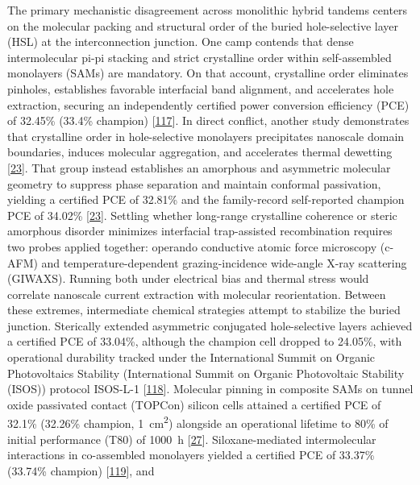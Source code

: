 \documentclass[
  11pt,
]{article}
\begin{document}
The primary mechanistic disagreement across monolithic hybrid tandems
centers on the molecular packing and structural order of the buried
hole-selective layer (HSL) at the interconnection junction. One camp
contends that dense intermolecular pi-pi stacking and strict crystalline
order within self-assembled monolayers (SAMs) are mandatory. On that
account, crystalline order eliminates pinholes, establishes favorable
interfacial band alignment, and accelerates hole extraction, securing an
independently certified power conversion efficiency (PCE) of 32.45\%
(33.4\% champion)
{[}\href{https://doi.org/10.1038/s41467-026-72160-x}{117}{]}. In direct
conflict, another study demonstrates that crystalline order in
hole-selective monolayers precipitates nanoscale domain boundaries,
induces molecular aggregation, and accelerates thermal dewetting
{[}\href{https://doi.org/10.1002/adma.73106}{23}{]}. That group instead
establishes an amorphous and asymmetric molecular geometry to suppress
phase separation and maintain conformal passivation, yielding a
certified PCE of 32.81\% and the family-record self-reported champion
PCE of 34.02\% {[}\href{https://doi.org/10.1002/adma.73106}{23}{]}.
Settling whether long-range crystalline coherence or steric amorphous
disorder minimizes interfacial trap-assisted recombination requires two
probes applied together: operando conductive atomic force microscopy
(c-AFM) and temperature-dependent grazing-incidence wide-angle X-ray
scattering (GIWAXS). Running both under electrical bias and thermal
stress would correlate nanoscale current extraction with molecular
reorientation. Between these extremes, intermediate chemical strategies
attempt to stabilize the buried junction. Sterically extended asymmetric
conjugated hole-selective layers achieved a certified PCE of 33.04\%,
although the champion cell dropped to 24.05\%, with operational
durability tracked under the International Summit on Organic
Photovoltaics Stability (International Summit on Organic Photovoltaic
Stability (ISOS)) protocol ISOS-L-1
{[}\href{https://doi.org/10.1038/s41467-026-73656-2}{118}{]}. Molecular
pinning in composite SAMs on tunnel oxide passivated contact (TOPCon)
silicon cells attained a certified PCE of 32.1\% (32.26\% champion,
\qty{1}{\centi\meter\squared}) alongside an operational lifetime to 80\%
of initial performance (T80) of \qty{1000}{\hour}
{[}\href{https://doi.org/10.1002/anie.5162616}{27}{]}. Siloxane-mediated
intermolecular interactions in co-assembled monolayers yielded a
certified PCE of 33.37\% (33.74\% champion)
{[}\href{https://doi.org/10.1002/aenm.71107}{119}{]}, and
\end{document}
